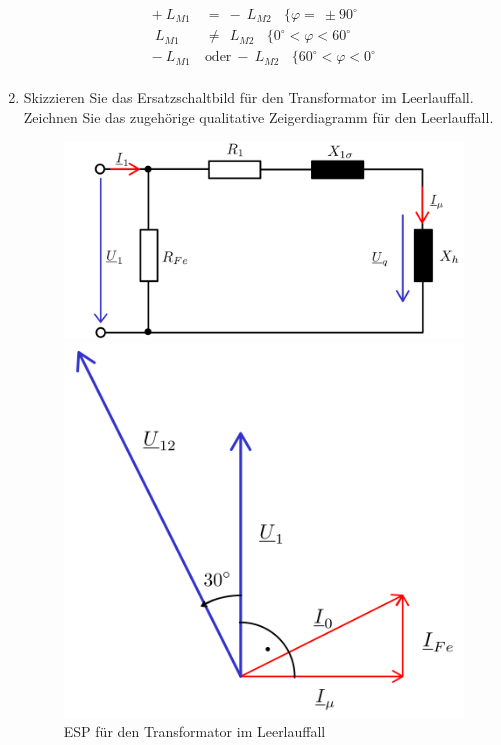 \begin{enumerate}[label=\alph*)]
\begin{align*}
		      +\ L_{M1}   & =\ -\ L_{M2}\ \ \ \ \{ \varphi =\ \pm90^\circ                \\
		      \ L_{M1}    & \neq\ \ L_{M2}\ \ \ \ \{ 0^\circ< \varphi < 60^\circ         \\
		      -\ L_{M1}\  & \text{oder}\ -\ L_{M2}\ \ \ \ \{ 60^\circ< \varphi < 0^\circ \\
	      \end{align*}
	\item Skizzieren Sie das Ersatzschaltbild für den Transformator im Leerlauffall.
	      Zeichnen Sie das zugehörige qualitative Zeigerdiagramm für den Leerlauffall.
	      \begin{figure}[h!]
		      \begin{center}
			      \begin{minipage}[t]{0.45\linewidth}
				      \begin{center}
					      \includegraphics[width=\linewidth]{img/2.2.2.1.png}
					      \caption{ESP für den Transformator im Leerlauffall}\label{img:2.2.2.1}
				      \end{center}
			      \end{minipage}\hfil
			      \begin{minipage}[t]{0.45\linewidth}
				      \begin{center}
					      \includegraphics[width=\linewidth]{img/2.2.2.2.png}

\end{center}
\end{minipage}
\end{center}
\end{figure}
\end{enumerate}
